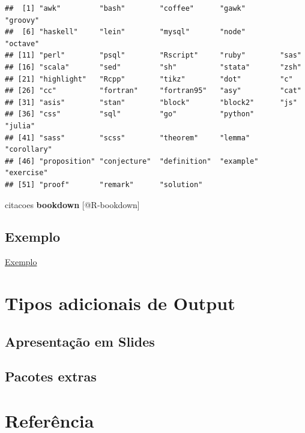 \documentclass[
]{book}
\begin{document}
\begin{verbatim}
##  [1] "awk"         "bash"        "coffee"      "gawk"        "groovy"     
##  [6] "haskell"     "lein"        "mysql"       "node"        "octave"     
## [11] "perl"        "psql"        "Rscript"     "ruby"        "sas"        
## [16] "scala"       "sed"         "sh"          "stata"       "zsh"        
## [21] "highlight"   "Rcpp"        "tikz"        "dot"         "c"          
## [26] "cc"          "fortran"     "fortran95"   "asy"         "cat"        
## [31] "asis"        "stan"        "block"       "block2"      "js"         
## [36] "css"         "sql"         "go"          "python"      "julia"      
## [41] "sass"        "scss"        "theorem"     "lemma"       "corollary"  
## [46] "proposition" "conjecture"  "definition"  "example"     "exercise"   
## [51] "proof"       "remark"      "solution"
\end{verbatim}

citacoes \textbf{bookdown} {[}@R-bookdown{]}

\hypertarget{exemplo}{%
\section{Exemplo}\label{exemplo}}

\href{exemplos/104-intro_blocos_de_codigo.html}{Exemplo}

\hypertarget{tipos-adicionais-de-output}{%
\chapter{Tipos adicionais de Output}\label{tipos-adicionais-de-output}}

\hypertarget{apresentauxe7uxe3o-em-slides}{%
\section{Apresentação em Slides}\label{apresentauxe7uxe3o-em-slides}}

\hypertarget{pacotes-extras}{%
\section{Pacotes extras}\label{pacotes-extras}}

\hypertarget{referuxeancia}{%
\chapter{Referência}\label{referuxeancia}}
\end{document}

